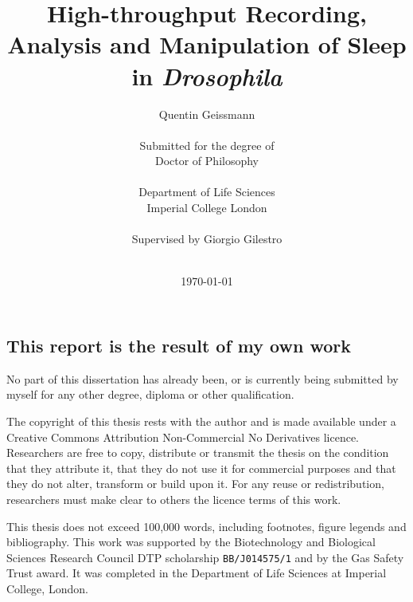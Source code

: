 


\title{High-throughput Recording, Analysis and Manipulation of Sleep in \emph{Drosophila}}
\author{Quentin Geissmann\\
\\
Submitted for the degree of\\
Doctor of Philosophy\\	
\\
Department of Life Sciences\\
Imperial College London\\
\\
\small{Supervised by Giorgio Gilestro}\\
\\
}

\date{\today}

\clearpage\maketitle
\thispagestyle{empty}
\newpage{}



\setcounter{tocdepth}{5}


\subsection*{This report is the result of my own work}
No part of this dissertation has already been, or is currently being submitted by myself for any other degree, diploma or other qualification.

The copyright of this thesis rests with the author and is made
available under a Creative Commons Attribution Non-Commercial No
Derivatives licence. Researchers are free to copy, distribute or
transmit the thesis on the condition that they attribute it, that they do
not use it for commercial purposes and that they do not alter,
transform or build upon it. For any reuse or redistribution,
researchers must make clear to others the licence terms of this
work.

This thesis does not exceed 100,000 words, including footnotes, figure legends and bibliography.
This work was supported by the Biotechnology and Biological Sciences Research Council DTP scholarship \texttt{BB/J014575/1}
and by the Gas Safety Trust award.
It was completed in the Department of Life Sciences at Imperial College, London.

\newpage
\newpage

